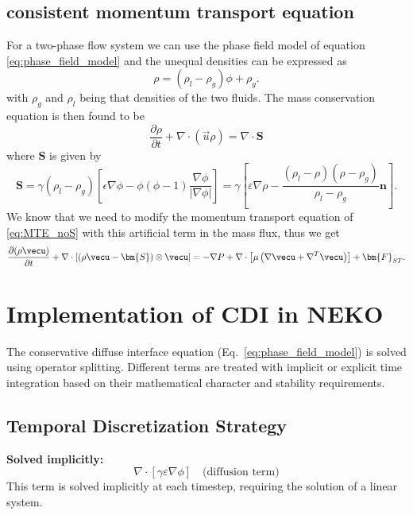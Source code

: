 \documentclass{article}
\begin{document}
\subsection{consistent momentum transport equation}
For a two-phase flow system we can use the phase field model of equation \eqref{eq:phase_field_model} and the unequal densities can be expressed as
\begin{equation}
    \rho = (\rho_l - \rho_g)\phi + \rho_g.
\end{equation}
with $\rho_g$ and $\rho_l$ being that densities of the two fluids. The mass conservation equation is then found to be
\begin{equation}
    \frac{\partial \rho}{\partial t}+\nabla \cdot(\vec{u} \rho)=\nabla \cdot \bm{S}
\end{equation}
where $\bm{S}$ is given by
\begin{equation}
    \bm{S}=\gamma\left(\rho_l-\rho_g\right)\left[\epsilon \nabla \phi-\phi(\phi-1) \frac{\nabla \phi}{|\nabla \phi|}\right]=\gamma\left[\varepsilon \nabla \rho-\frac{\left(\rho_l-\rho\right)\left(\rho-\rho_g\right)}{\rho_l-\rho_g} \bm{n}\right] .
\end{equation}
We know that we need to modify the momentum transport equation of \eqref{eq:MTE_noS} with this artificial term in the mass flux, thus we get
\begin{equation}
    \frac{\partial (\rho \vecu)}{\partial t} + \nabla \cdot \left[(\rho \vecu - \bm{S}) \otimes \vecu \right] =  -\nabla P + \nabla \cdot \left[\mu \left(\nabla \vecu + \nabla^T \vecu \right) \right] + \bm{F}_{ST}.
    \label{eq:MTE_withS}
\end{equation}

\section{Implementation of CDI in NEKO}

The conservative diffuse interface equation (Eq.~\ref{eq:phase_field_model}) is solved using operator splitting. Different terms are treated with implicit or explicit time integration based on their mathematical character and stability requirements.

\subsection{Temporal Discretization Strategy}

\textbf{Solved implicitly:}
\begin{equation}
    \nabla \cdot [\gamma \varepsilon \nabla \phi] \quad \text{(diffusion term)}
\end{equation}
This term is solved implicitly at each timestep, requiring the solution of a linear system.
\end{document}
